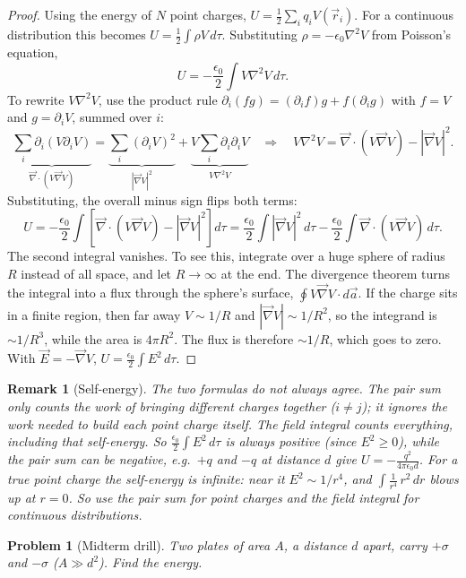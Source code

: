 \documentclass{article}
\newtheorem{problem}{Problem}
\newtheorem{remark}{Remark}
\begin{document}
\begin{proof}
    Using the energy of $N$ point charges, $U = \frac{1}{2}\sum_i q_i V(\vec{r}_i)$. For a continuous distribution this becomes $U = \frac{1}{2}\int\rho V\,d\tau$. Substituting $\rho = -\epsilon_0\nabla^2 V$ from Poisson's equation,
    \[U = -\frac{\epsilon_0}{2}\int V\nabla^2 V\,d\tau.\]
    To rewrite $V\nabla^2V$, use the product rule $\partial_i(fg) = (\partial_i f)g + f(\partial_i g)$ with $f = V$ and $g = \partial_i V$, summed over $i$:
    \[\underbrace{\sum_i\partial_i(V\partial_i V)}_{\vec{\nabla}\cdot(V\vec{\nabla}V)} = \underbrace{\sum_i(\partial_i V)^2}_{|\vec{\nabla}V|^2} + \underbrace{V\sum_i\partial_i\partial_i V}_{V\nabla^2 V}
    \quad\Longrightarrow\quad
    V\nabla^2 V = \vec{\nabla}\cdot(V\vec{\nabla}V) - |\vec{\nabla}V|^2.\]
    Substituting, the overall minus sign flips both terms:
    \[U = -\frac{\epsilon_0}{2}\int\left[\vec{\nabla}\cdot(V\vec{\nabla}V) - |\vec{\nabla}V|^2\right]d\tau = \frac{\epsilon_0}{2}\int|\vec{\nabla}V|^2\,d\tau - \frac{\epsilon_0}{2}\int\vec{\nabla}\cdot(V\vec{\nabla}V)\,d\tau.\]
    The second integral vanishes. To see this, integrate over a huge sphere of radius $R$ instead of all space, and let $R\to\infty$ at the end. The divergence theorem turns the integral into a flux through the sphere's surface, $\oint V\vec{\nabla}V\cdot d\vec{a}$. If the charge sits in a finite region, then far away $V \sim 1/R$ and $|\vec{\nabla}V| \sim 1/R^2$, so the integrand is $\sim 1/R^3$, while the area is $4\pi R^2$. The flux is therefore $\sim 1/R$, which goes to zero. With $\vec{E} = -\vec{\nabla}V$, $U = \frac{\epsilon_0}{2}\int E^2\,d\tau$.
\end{proof}
\begin{remark}[Self-energy]
    The two formulas do not always agree. The pair sum only counts the work of bringing different charges together ($i \neq j$); it ignores the work needed to build each point charge itself. The field integral counts everything, including that self-energy. So $\frac{\epsilon_0}{2}\int E^2\,d\tau$ is always positive (since $E^2 \geq 0$), while the pair sum can be negative, e.g.\ $+q$ and $-q$ at distance $d$ give $U = -\frac{q^2}{4\pi\epsilon_0 d}$. For a true point charge the self-energy is infinite: near it $E^2 \sim 1/r^4$, and $\int \frac{1}{r^4}\,r^2\,dr$ blows up at $r = 0$. So use the pair sum for point charges and the field integral for continuous distributions.
\end{remark}
\begin{problem}[Midterm drill]
    Two plates of area $A$, a distance $d$ apart, carry $+\sigma$ and $-\sigma$ ($A \gg d^2$). Find the energy.
\end{problem}
\end{document}
